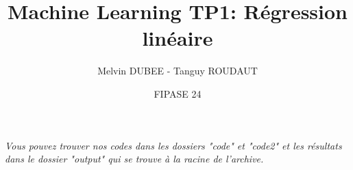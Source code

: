 \documentclass{styles/articleEnsta}
\title{Machine Learning TP1: Régression linéaire}
\author{Melvin DUBEE - Tanguy ROUDAUT \and FIPASE 24}
\begin{document}
\maketitle

\textit{Vous pouvez trouver nos codes dans les dossiers "code" et "code2" et les résultats dans le dossier "output" qui se trouve à la racine de l'archive.}




\end{document}
